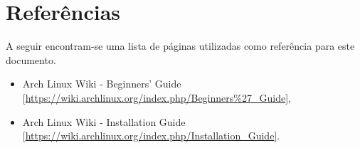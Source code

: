 \documentclass[A4paper]{article}
\begin{document}
\section*{Referências}
A seguir encontram-se uma lista de páginas utilizadas como referência para este
documento.
\begin{itemize}
  \item Arch Linux Wiki - Beginners' Guide
    [\url{https://wiki.archlinux.org/index.php/Beginners%27_Guide}],
  \item Arch Linux Wiki - Installation Guide
    [\url{https://wiki.archlinux.org/index.php/Installation_Guide}].
\end{itemize}
\end{document}
